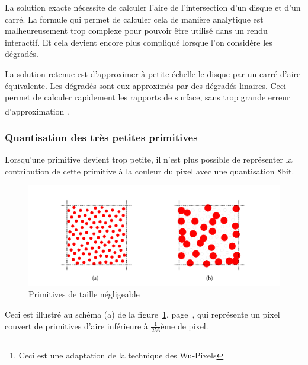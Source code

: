 			La solution exacte nécessite de calculer l'aire de l'intersection d'un disque et d'un carré. 
			La formule qui permet de calculer cela de manière analytique est malheureusement trop complexe pour
			pouvoir être utilisé dans un rendu interactif. Et cela devient encore plus compliqué lorsque 
			l'on considère les dégradés.

			La solution retenue est d'approximer à petite échelle le disque par un carré d'aire équivalente.
			Les dégradés sont eux approximés par des dégradés linaires. Ceci permet de calculer rapidement les
			rapports de surface, sans trop grande erreur d'approximation\footnote{Ceci est une adaptation de la technique des Wu-Pixels\cite{wupixel}}.

		\subsubsection{\label{tpquan} Quantisation des très petites primitives }
			Lorsqu'une primitive devient trop petite, il n'est plus possible de 
			représenter la contribution de cette primitive à la couleur du pixel avec une quantisation 8bit. 
				\begin{figure}[ht]
					\centering
					\includegraphics[width=\textwidth]{images/petites-primitives} 
					\caption{Primitives de taille négligeable}
					\label{fig:petit}
				\end{figure}
			Ceci est illustré au schéma (a) de la figure~\ref{fig:petit}, page~\pageref{fig:petit}, qui
			représente un pixel couvert de primitives d'aire inférieure à $\frac{1}{256}$ème de pixel.


